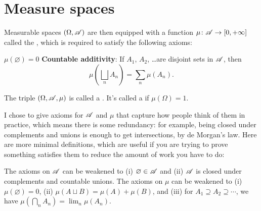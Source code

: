 \section{Measure spaces}
\begin{definition}
	Measurable spaces $(\Omega, \mathscr A)$ are then equipped
	with a function $\mu \colon \mathscr A \to [0, +\infty]$
	called the , which is required to satisfy
	the following axioms:
	\begin{itemize}
		\ii $\mu(\varnothing) = 0$
		\ii \textbf{Countable additivity}:
		If $A_1$, $A_2$, \dots are disjoint sets in $\mathscr A$,
		then \[ \mu\left( \bigsqcup_n A_n \right) = \sum_n \mu(A_n). \]
	\end{itemize}
	The triple $(\Omega, \mathscr A, \mu)$ is called a .
	It's called a  if $\mu(\Omega) = 1$.
\end{definition}
\begin{exercise}
	I chose to give axioms for $\mathscr A$ and $\mu$
	that capture how people think of them in practice,
	which means there is some redundancy:
	for example, being closed under complements and unions
	is enough to get intersections, by de Morgan's law.
	Here are more minimal definitions,
	which are useful if you are trying to prove something satisfies them
	to reduce the amount of work you have to do:
	\begin{enumerate}[(a)]
		\ii The axioms on $\mathscr A$ can be weakened
		to (i) $\varnothing \in \mathscr A$ and (ii) $\mathscr A$ is closed under
		complements and countable unions.
		\ii The axioms on $\mu$ can be weakened to
		(i) $\mu(\varnothing) = 0$,
		(ii) $\mu(A \sqcup B) = \mu(A) + \mu(B)$, and
		(iii) for $A_1 \supseteq A_2 \supseteq \cdots$,
		we have $\mu\left( \bigcap_n A_n \right) = \lim_n \mu(A_n)$.
	\end{enumerate}
\end{exercise}


